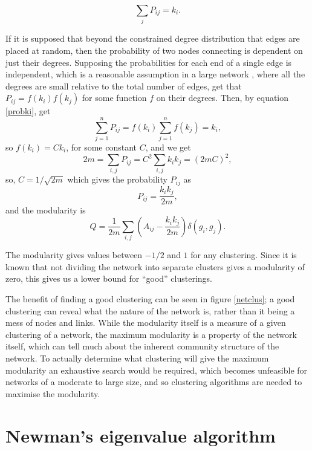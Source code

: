 \begin{equation}
\sum_j P_{ij} = k_i.
\label{probki}
\end{equation}

If it is supposed that beyond the constrained degree distribution that edges are placed at random, 
then the probability of two nodes connecting is dependent on just their 
degrees. Supposing the probabilities for each end of a single edge is independent, which is a reasonable assumption in a large network \cite{Newman2010a}, where all the degrees are small 
relative to the total number of edges, get that $P_{ij} = f(k_i)f(k_j)$ for 
some function $f$ on their degrees.  Then, by equation \ref{probki}, get
\begin{equation}
\sum_{j=1}^{n}P_{ij} = f(k_i)\sum_{j=1}^nf(k_j)=k_i,
\end{equation}
so $f(k_i) = Ck_i$, for some constant $C$, and we get
\begin{equation}
2m = \sum_{i,j}P_{ij} = C^2\sum_{i,j}k_ik_j = (2mC)^2,
\end{equation}
so, $C = 1/\sqrt{2m}$ which gives the probability $P_{ij}$ as
\begin{equation}
P_{ij} = \frac{k_i k_j}{2m},
\end{equation}
and the modularity is
\begin{equation}\label{NewMod}
Q= \frac{1}{2m}\sum_{i,j} \left(A_{ij} -
\frac{k_ik_j}{2m}\right)\delta(g_i,g_j).
\end{equation}

The modularity gives values between $-1/2$ and $1$ for any clustering.  Since it is known that not 
dividing the network into separate clusters gives a modularity of zero, this 
gives us a lower bound for ``good'' clusterings.

The benefit of finding a good clustering can be seen in figure \ref{netclus}; 
a good clustering can reveal what the nature of the network is, rather than it 
being a mess of nodes and links.  While the modularity itself is a measure of a 
given clustering of a network, the maximum modularity is a property of the 
network itself, which can tell much about the inherent community structure of the 
network. To actually determine what clustering will give the maximum modularity an exhaustive search would be required, which becomes unfeasible for networks of 
a moderate to large size, and so clustering algorithms are needed to 
maximise the modularity.



\section{Newman's eigenvalue algorithm}

